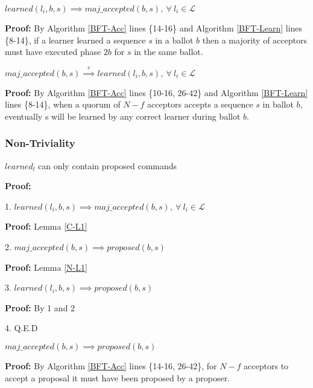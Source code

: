 \begin{lemma}
$learned(l_i,b,s) \implies maj\_accepted(b,s),\ \forall\ l_i \in \mathcal{L}$ \label{C-L1} \par
\end{lemma} 

\textbf{Proof:} By Algorithm \ref{BFT-Acc} lines \{14-16\} and Algorithm \ref{BFT-Learn} lines \{8-14\}, if a learner learned a sequence $s$ in a ballot $b$ then a majority of acceptors must have executed phase $2b$ for $s$ in the same ballot.

\begin{lemma}
$maj\_accepted(b,s) \overset{e}{\implies} learned(l_i,b,s),\ \forall\ l_i \in \mathcal{L}$ \label{C-L2} \par
\end{lemma}
\textbf{Proof:} By Algorithm \ref{BFT-Acc} lines \{10-16, 26-42\} and Algorithm \ref{BFT-Learn} lines \{8-14\}, when a quorum of $N-f$ acceptors accepts a sequence $s$ in ballot $b$, eventually s will be learned by any correct learner during ballot $b$.


\subsubsection{Non-Triviality}
\begin{theorem}
$learned_l$ can only contain proposed commands \label{N-T1} \par
\end{theorem} 

\textbf{Proof:} \par
1. $learned(l_i,b,s) \implies maj\_accepted(b,s),\ \forall\ l_i \in \mathcal{L}$ \par
\indent\indent\textbf{Proof:} Lemma \ref{C-L1} \par
2. $maj\_accepted(b,s) \implies proposed(b,s)$ \par
\indent\indent\textbf{Proof:} Lemma \ref{N-L1}\par
3. $learned(l_i,b,s) \implies proposed(b,s)$ \par
\indent\indent\textbf{Proof:} By 1 and 2 \par
4. Q.E.D \par

\begin{lemma}
$maj\_accepted(b,s) \implies proposed(b,s)$ \label{N-L1} \par
\end{lemma}

\textbf{Proof:} By Algorithm \ref{BFT-Acc} lines \{14-16, 26-42\}, for $N-f$ acceptors to accept a proposal it must have been proposed by a proposer.

